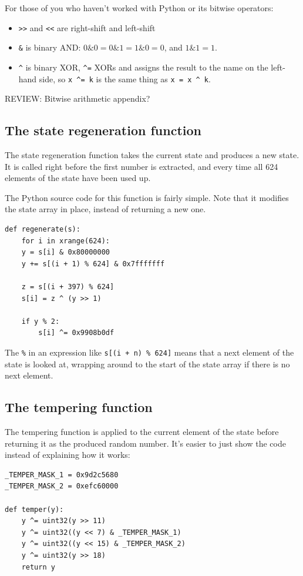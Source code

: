 \documentclass[11pt,ebook,table,dvipsnames]{memoir}
\begin{document}
For those of you who haven't worked with Python or its bitwise
operators:

\begin{itemize}
\item \verb~>>~ and \verb~<<~ are right-shift and left-shift
\item \verb~&~ is binary AND: $0 \& 0 = 0 \& 1 = 1 \& 0 = 0$, and $1 \& 1 =
   1$.
\item \verb~^~ is binary XOR, \verb~^=~ XORs and assigns the result to
the name on the left-hand side, so \verb~x ^= k~ is the same
thing as \verb~x = x ^ k~.
\end{itemize}

REVIEW: Bitwise arithmetic appendix?
\subsection{The state regeneration function}
\label{sec-2-10-6-3}

The state regeneration function takes the current state and produces a
new state. It is called right before the first number is extracted,
and every time all 624 elements of the state have been used up.

The Python source code for this function is fairly simple. Note that
it modifies the state array in place, instead of returning a new one.

\begin{verbatim}
def regenerate(s):
    for i in xrange(624):
	y = s[i] & 0x80000000
	y += s[(i + 1) % 624] & 0x7fffffff

	z = s[(i + 397) % 624]
	s[i] = z ^ (y >> 1)

	if y % 2:
	    s[i] ^= 0x9908b0df
\end{verbatim}

The \verb~%~ in an expression like \verb~s[(i + n) % 624]~ means that a next
element of the state is looked at, wrapping around to the start of the
state array if there is no next element.
\subsection{The tempering function}
\label{sec-2-10-6-4}

The tempering function is applied to the current element of the state
before returning it as the produced random number. It's easier to just
show the code instead of explaining how it works:

\begin{verbatim}
_TEMPER_MASK_1 = 0x9d2c5680
_TEMPER_MASK_2 = 0xefc60000

def temper(y):
    y ^= uint32(y >> 11)
    y ^= uint32((y << 7) & _TEMPER_MASK_1)
    y ^= uint32((y << 15) & _TEMPER_MASK_2)
    y ^= uint32(y >> 18)
    return y
\end{verbatim}
\end{document}
